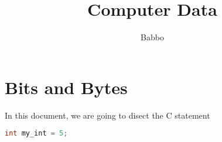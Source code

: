 \documentclass{article}
\begin{document}
\author{Babbo}
\date{}
\title{Computer Data}

\maketitle

\section*{Bits and Bytes}
In this document, we are going to disect the C statement

\begin{lstlisting}[language=C]
int my_int = 5;
\end{lstlisting}
\end{document}
